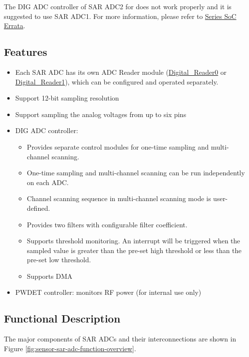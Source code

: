 \documentclass[main\_\_EN.tex]{subfiles}
\begin{document}
\begin{tiplisting}
The DIG ADC controller of SAR ADC2 for \chipname{} does not work properly and it is suggested to use SAR ADC1. For more information, please refer to \href{\linkprefix\linkchiperrataEN}{\chipseries{} Series SoC Errata}.
\end{tiplisting}

\subsection{Features}
\begin{itemize}
\item Each SAR ADC has its own ADC Reader module (\hyperref[other:sensor-item-read-data-from-sar-adc1]{Digital\_Reader0} or  \hyperref[other:sensor-item-read-data-from-sar-adc1]{Digital\_Reader1}), which can be configured and operated separately. 
\item Support 12-bit sampling resolution
\item Support sampling the analog voltages from up to six pins

\item DIG ADC controller:
    \begin{itemize}
        \item Provides separate control modules for one-time sampling and multi-channel scanning. 
        \item One-time sampling and multi-channel scanning can be run independently on each ADC.
        \item Channel scanning sequence in multi-channel scanning mode is user-defined.
        \item Provides two filters with configurable filter coefficient.
        \item Supports threshold monitoring. An interrupt will be triggered when the sampled value is greater than the pre-set high threshold or less than the pre-set low threshold.
        \item Supports DMA
    \end{itemize}
\item PWDET controller: monitors RF power (for internal use only)
\end{itemize}


\subsection{Functional Description}

The major components of SAR ADCs and their interconnections are shown in Figure  \ref{fig:sensor-sar-adc-function-overview}.
\end{document}
